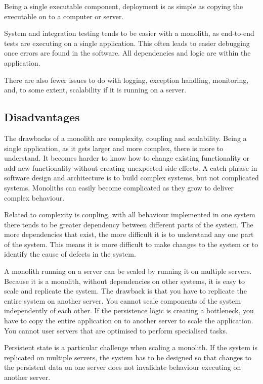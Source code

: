 Being a single executable component, deployment is as simple as copying the executable on to a computer or server.

System and integration testing tends to be easier with a monolith, as end-to-end tests are executing on a single application.
This often leads to easier debugging once errors are found in the software.
All dependencies and logic are within the application.	

There are also fewer issues to do with logging, exception handling, monitoring,
and, to some extent, scalability if it is running on a server.

\subsection{Disadvantages}

The drawbacks of a monolith are complexity, coupling and scalability.
Being a single application, as it gets larger and more complex, there is more to understand.
It becomes harder to know how to change existing functionality or add new functionality without creating unexpected side effects.
A catch phrase in software design and architecture is to build complex systems, but not complicated systems.
Monoliths can easily become complicated as they grow to deliver complex behaviour.

Related to complexity is coupling, with all behaviour implemented in one system
there tends to be greater dependency between different parts of the system.
The more dependencies that exist, the more difficult it is to understand any one part of the system.
This means it is more difficult to make changes to the system or to identify the cause of defects in the system.

A monolith running on a server can be scaled by running it on multiple servers.
Because it is a monolith, without dependencies on other systems, it is easy to scale and replicate the system.
The drawback is that you have to replicate the entire system on another server.
You cannot scale components of the system independently of each other.
If the persistence logic is creating a bottleneck, you have to copy the entire application on to another server to scale the application.
You cannot user servers that are optimised to perform specialised tasks.

Persistent state is a particular challenge when scaling a monolith.
If the system is replicated on multiple servers,
the system has to be designed so that changes to the persistent data on one server
does not invalidate behaviour executing on another server.


